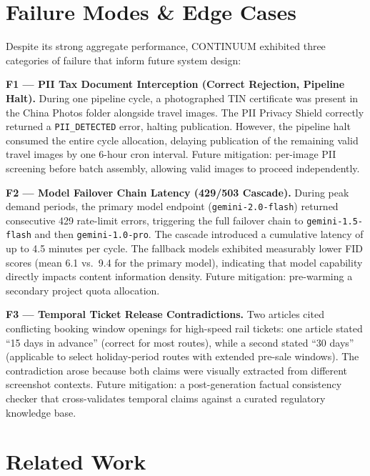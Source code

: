 \documentclass[conference]{IEEEtran}
\begin{document}
\section{Failure Modes \& Edge Cases}
\label{sec:failures}

Despite its strong aggregate performance, \textsc{CONTINUUM} exhibited three
categories of failure that inform future system design:

\textbf{F1 — PII Tax Document Interception (Correct Rejection, Pipeline Halt).}
During one pipeline cycle, a photographed TIN certificate was present in the
China Photos folder alongside travel images. The PII Privacy Shield correctly
returned a \texttt{PII\_DETECTED} error, halting publication. However, the
pipeline halt consumed the entire cycle allocation, delaying publication of the
remaining valid travel images by one 6-hour cron interval. Future mitigation:
per-image PII screening before batch assembly, allowing valid images to proceed
independently.

\textbf{F2 — Model Failover Chain Latency (429/503 Cascade).}
During peak demand periods, the primary model endpoint (\texttt{gemini-2.0-flash})
returned consecutive 429 rate-limit errors, triggering the full failover chain
to \texttt{gemini-1.5-flash} and then \texttt{gemini-1.0-pro}. The cascade
introduced a cumulative latency of up to 4.5 minutes per cycle. The fallback
models exhibited measurably lower FID scores (mean 6.1 vs.\ 9.4 for the
primary model), indicating that model capability directly impacts content
information density. Future mitigation: pre-warming a secondary project quota
allocation.

\textbf{F3 — Temporal Ticket Release Contradictions.}
Two articles cited conflicting booking window openings for high-speed rail
tickets: one article stated ``15 days in advance'' (correct for most routes),
while a second stated ``30 days'' (applicable to select holiday-period routes
with extended pre-sale windows). The contradiction arose because both claims
were visually extracted from different screenshot contexts. Future mitigation:
a post-generation factual consistency checker that cross-validates temporal
claims against a curated regulatory knowledge base.

\section{Related Work}
\label{sec:related}
\end{document}

